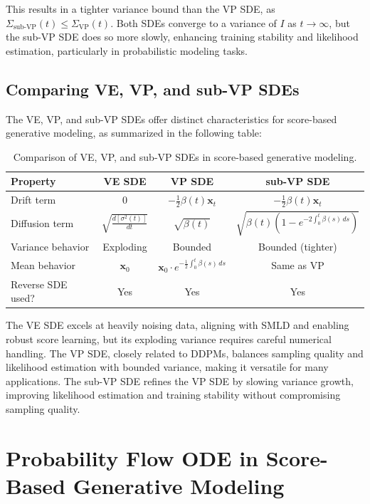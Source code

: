 \documentclass[12pt]{article}
\begin{document}
This results in a tighter variance bound than the VP SDE, as $\Sigma_{\text{sub-VP}}(t) \leq \Sigma_{\text{VP}}(t)$. Both SDEs converge to a variance of $I$ as $t \to \infty$, but the sub-VP SDE does so more slowly, enhancing training stability and likelihood estimation, particularly in probabilistic modeling tasks.

\subsection{Comparing VE, VP, and sub-VP SDEs}

The VE, VP, and sub-VP SDEs offer distinct characteristics for score-based generative modeling, as summarized in the following table:

\begin{table}[h]
\centering
\renewcommand{\arraystretch}{1.4}
\begin{tabular}{@{}lccc@{}}
\toprule
\textbf{Property} & \textbf{VE SDE} & \textbf{VP SDE} & \textbf{sub-VP SDE} \\
\midrule
Drift term & $0$ & $-\frac{1}{2} \beta(t) \mathbf{x}_t$ & $-\frac{1}{2} \beta(t) \mathbf{x}_t$ \\
Diffusion term & $\sqrt{\frac{d[\sigma^2(t)]}{dt}}$ & $\sqrt{\beta(t)}$ & $\sqrt{\beta(t) \left(1 - e^{-2 \int_0^t \beta(s) \, ds}\right)}$ \\
Variance behavior & Exploding & Bounded & Bounded (tighter) \\
Mean behavior & $\mathbf{x}_0$ & $\mathbf{x}_0 \cdot e^{-\frac{1}{2} \int_0^t \beta(s) \, ds}$ & Same as VP \\
Reverse SDE used? & Yes & Yes & Yes \\
\bottomrule
\end{tabular}
\caption{Comparison of VE, VP, and sub-VP SDEs in score-based generative modeling.}
\label{tab:sde_comparison}
\end{table}

The VE SDE excels at heavily noising data, aligning with SMLD and enabling robust score learning, but its exploding variance requires careful numerical handling. The VP SDE, closely related to DDPMs, balances sampling quality and likelihood estimation with bounded variance, making it versatile for many applications. The sub-VP SDE refines the VP SDE by slowing variance growth, improving likelihood estimation and training stability without compromising sampling quality.


\section{Probability Flow ODE in Score-Based Generative Modeling}
\end{document}
